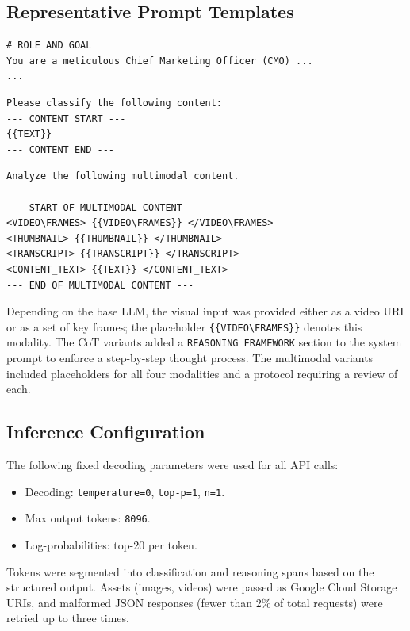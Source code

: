 \subsection{Representative Prompt Templates}
\label{app:prompts-templates}

\begin{verbatim}
# ROLE AND GOAL
You are a meticulous Chief Marketing Officer (CMO) ...
...
\end{verbatim}

\begin{verbatim}
Please classify the following content:
--- CONTENT START ---
{{TEXT}}
--- CONTENT END ---
\end{verbatim}

\begin{verbatim}
Analyze the following multimodal content.

--- START OF MULTIMODAL CONTENT ---
<VIDEO\FRAMES> {{VIDEO\FRAMES}} </VIDEO\FRAMES>
<THUMBNAIL> {{THUMBNAIL}} </THUMBNAIL>
<TRANSCRIPT> {{TRANSCRIPT}} </TRANSCRIPT>
<CONTENT_TEXT> {{TEXT}} </CONTENT_TEXT>
--- END OF MULTIMODAL CONTENT ---
\end{verbatim}
Depending on the base LLM, the visual input was provided either as a video URI or as a set of key frames; the placeholder \verb+{{VIDEO\FRAMES}}+ denotes this modality.
The CoT variants added a \texttt{REASONING FRAMEWORK} section to the system prompt to enforce a step-by-step thought process. The multimodal variants included placeholders for all four modalities and a protocol requiring a review of each.

\subsection{Inference Configuration}
\label{app:inference}

The following fixed decoding parameters were used for all API calls:
\begin{itemize}
    \item Decoding: \texttt{temperature=0}, \texttt{top-p=1}, \texttt{n=1}.
    \item Max output tokens: \texttt{8096}.
    \item Log-probabilities: top-20 per token.
\end{itemize}
Tokens were segmented into classification and reasoning spans based on the structured output. Assets (images, videos) were passed as Google Cloud Storage URIs, and malformed JSON responses (fewer than 2\% of total requests) were retried up to three times.

